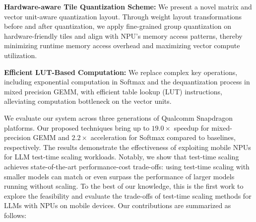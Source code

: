 \textbf{Hardware-aware Tile Quantization Scheme:} We present a novel matrix and vector unit-aware quantization layout. Through weight layout transformations before and after quantization, we apply fine-grained group quantization on hardware-friendly tiles and align with NPU's memory access patterns, thereby minimizing runtime memory access overhead and maximizing vector compute utilization.

\textbf{Efficient LUT-Based Computation:} We replace complex key operations, including exponential computation in Softmax and the dequantization process in mixed precision GEMM, with efficient table lookup (LUT) instructions, alleviating computation bottleneck on the vector units.

We evaluate our system across three generations of Qualcomm Snapdragon platforms. Our proposed techniques bring up to $19.0\times$ speedup for mixed-precision GEMM and $2.2\times$ acceleration for Softmax compared to baselines, respectively. The results demonstrate the effectiveness of exploiting mobile NPUs for LLM test-time scaling workloads. Notably, we show that test-time scaling achieves state-of-the-art performance-cost trade-offs: using test-time scaling with smaller models can match or even surpass the performance of larger models running without scaling. To the best of our knowledge, this is the first work to explore the feasibility and evaluate the trade-offs of test-time scaling methods for LLMs with NPUs on mobile devices. Our contributions are summarized as follows:


